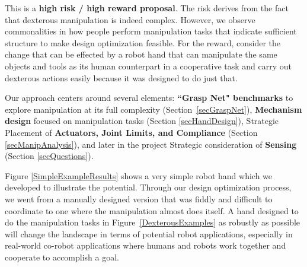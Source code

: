 This is a {\bf high risk / high reward proposal}.   The risk derives from the fact that dexterous manipulation is indeed complex.   However, we observe commonalities in how people perform manipulation tasks that indicate sufficient structure to make design optimization feasible.   For the reward, consider the change that can be effected by a robot hand that can manipulate the same objects and tools as its human counterpart in a cooperative task and carry out dexterous actions easily because it was designed to do just that.

Our approach centers around several elements:  {\bf ``Grasp Net" benchmarks} to explore manipulation at its full complexity (Section~\ref{secGraspNet}), {\bf Mechanism design} focused on manipulation tasks (Section \ref{secHandDesign}),  Strategic Placement of {\bf Actuators, Joint Limits, and Compliance} (Section \ref{secManipAnalysis}), and later in the project Strategic consideration of {\bf Sensing} (Section \ref{secQuestions}).

Figure \ref{SimpleExampleResults} shows a very simple robot hand which we developed to illustrate the potential.  Through our design optimization process, we went from a manually designed version that was fiddly and difficult to coordinate to one where the manipulation almost does itself.  A hand designed to do the manipulation tasks in Figure~\ref{DexterousExamples} as robustly as possible will change the landscape in terms of potential robot applications, especially in real-world co-robot applications where humans and robots work together and cooperate to accomplish a goal.


	

